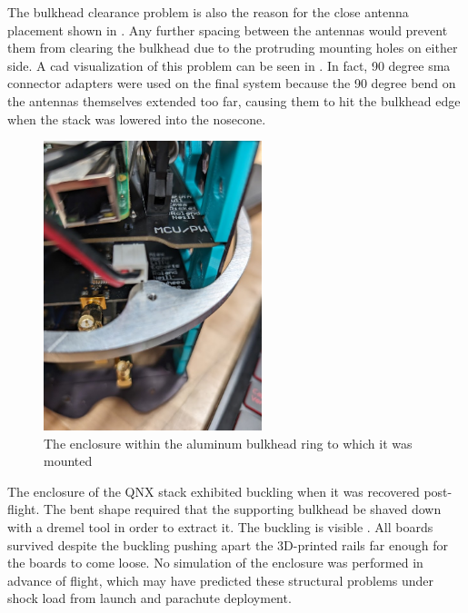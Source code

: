 The bulkhead clearance problem is also the reason for the close antenna placement shown in .
Any further spacing between the antennas would prevent them from clearing the bulkhead due to the protruding mounting
holes on either side. A \gls{cad} visualization of this problem can be seen in . In fact, 90 degree
\gls{sma} connector adapters were used on the final system because the 90 degree bend on the antennas themselves
extended too far, causing them to hit the bulkhead edge when the stack was lowered into the nosecone.

\begin{figure}[H]
    \center
    \includegraphics[width=2.5in]{assets/images/stack-bulkhead.jpg}
    \caption{The enclosure within the aluminum bulkhead ring to which it was mounted}
    \label{fig:stack-bulkhead}
\end{figure}

The enclosure of the QNX stack exhibited buckling when it was recovered post-flight. The bent shape required that the
supporting bulkhead be shaved down with a dremel tool in order to extract it. The buckling is visible
. All boards survived despite the buckling pushing apart the 3D-printed rails far enough for the
boards to come loose. No simulation of the enclosure was performed in advance of flight, which may have predicted these
structural problems under shock load from launch and parachute deployment.

